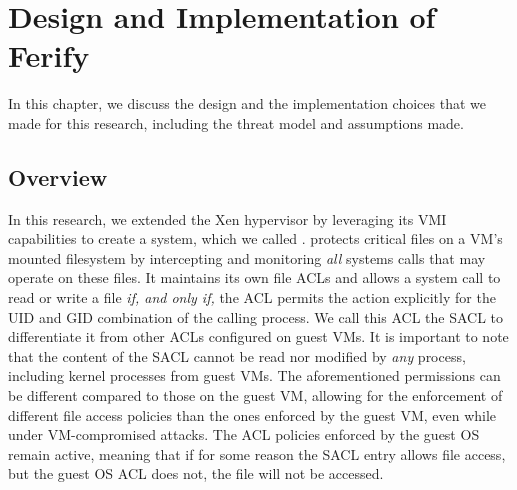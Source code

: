 {}

\chapter{Design and Implementation of Ferify}\label{ch:chapter3}

In this chapter, we discuss the design and the implementation choices that we made for this research, including the threat model and assumptions made.

\section{Overview}\label{sec:overview}

\par In this research, we extended the Xen hypervisor by leveraging its \ac{VMI} capabilities to create a system, which we called .  protects critical files on a \ac{VM}'s mounted filesystem by intercepting and monitoring \emph{all} systems calls that may operate on these files. It maintains its own file \acp{ACL} and allows a system call to read or write a file \emph{if, and only if,} the \ac{ACL} permits the action explicitly for the \ac{UID} and \ac{GID} combination of the calling process. We call this \ac{ACL} the \ac{SACL} to differentiate it from other \acp{ACL} configured on guest \acp{VM}. It is important to note that the content of the \ac{SACL} cannot be read nor modified by \emph{any} process, including kernel processes from guest \acp{VM}. The aforementioned permissions can be different compared to those on the guest \ac{VM}, allowing for the enforcement of different file access policies than the ones enforced by the guest \ac{VM}, even while under \ac{VM}-compromised attacks. The \ac{ACL} policies enforced by the guest \ac{OS} remain active, meaning that if for some reason the \ac{SACL} entry allows file access, but the guest \ac{OS} \ac{ACL} does not, the file will not be accessed.


